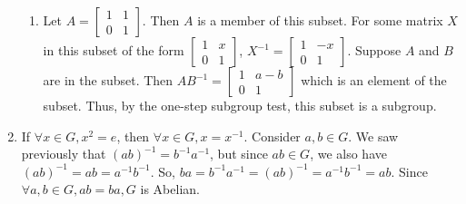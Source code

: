 \documentclass{article}
\begin{document}
\begin{enumerate}
\begin{enumerate}
            \item Let $A = \begin{bmatrix}
                1 & 1 \\ 0 & 1
            \end{bmatrix}$. Then $A$ is a member of this subset. For some matrix $X$ in this subset of the form $\begin{bmatrix}
                1 & x \\ 0 & 1
            \end{bmatrix}$, $X^{-1} = \begin{bmatrix}
                1 & -x \\ 0 & 1
            \end{bmatrix}$. Suppose $A$ and $B$ are in the subset. Then $AB^{-1} = \begin{bmatrix}
                 1 & a - b \\ 0 & 1
            \end{bmatrix}$ which is an element of the subset. Thus, by the one-step subgroup test, this subset is a subgroup. 
        \end{enumerate}
    \item If $\forall x \in G, x^2 = e$, then $\forall x \in G, x = x^{-1}$. Consider $a, b \in G$. We saw previously that $(ab)^{-1} = b^{-1}a^{-1}$, but since $ab \in G$, we also have $(ab)^{-1} = ab = a^{-1}b^{-1}$. So, $ba = b^{-1}a^{-1} = (ab)^{-1} = a^{-1}b^{-1} = ab$. Since $\forall a, b \in G, ab=ba, G$ is Abelian.
\end{enumerate}
\end{document}
